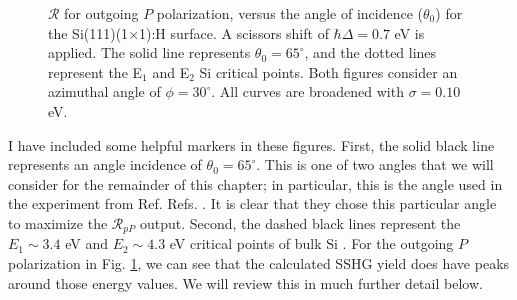 \begin{figure}[H]
\centering
{}\hfill
{}
\caption{$\mathcal{R}$ for outgoing $P$ polarization, versus the angle of
incidence ($\theta_{0}$) for the Si(111)(1$\times$1):H surface. A scissors shift
of $\hbar\Delta = 0.7$ eV is applied. The solid line represents $\theta_{0} =
65^{\circ}$, and the dotted lines represent the E$_{1}$ and E$_{2}$ Si critical
points. Both figures consider an azimuthal angle of $\phi = 30^{\circ}$. All
curves are broadened with $\sigma = 0.10$ eV.}
\label{fig:1x1rP3d}
\end{figure}

I have included some helpful markers in these figures. First, the solid black
line represents an angle incidence of $\theta_{0} = 65^{\circ}$. This is one of
two angles that we will consider for the remainder of this chapter; in
particular, this is the angle used in the experiment from Ref. Refs.
\cite{mejiaPRB02}. It is clear that they chose this particular angle to maximize
the $\mathcal{R}_{pP}$ output. Second, the dashed black lines represent the
$E_{1}\sim 3.4$ eV and $E_{2}\sim 4.3$ eV critical points of bulk Si
\cite{yubook}. For the outgoing $P$ polarization in Fig. \ref{fig:1x1rP3d}, we
can see that the calculated SSHG yield does have peaks around those energy
values. We will review this in much further detail below.

